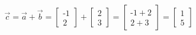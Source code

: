 \documentclass[preview]{standalone}
\begin{document}
\begin{align*}
\vec{c} = \vec{a} + \vec{b} = \begin{bmatrix} \text{-}1 \\ 2 \end{bmatrix} + \begin{bmatrix} 2 \\ 3 \end{bmatrix} = \begin{bmatrix} \text{-}1 + 2 \\ 2 + 3 \end{bmatrix} = \begin{bmatrix} 1 \\ 5 \end{bmatrix}
\end{align*}
\end{document}
